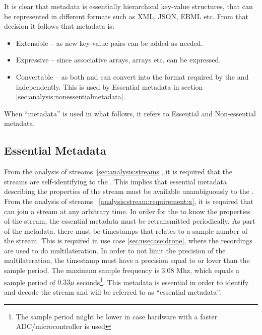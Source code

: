 It is clear that metadata is essentially hierarchical key-value structures, that can be represented in different formats such as XML, JSON, EBML etc.  From that decision it follows that metadata is:
\begin{itemize}
	\item Extensible -- as new key-value pairs can be added as needed.
	\item Expressive -- since associative arrays, arrays etc. can be expressed.
	\item Convertable -- as both  and  can convert into the format required by the  and  independently. This is used by Essential metadata in section \ref{sec:analysis:nonessentialmetadata}.
\end{itemize}

When ``metadata'' is used in what follows, it refers to Essential and Non-essential metadata.

\subsection{Essential Metadata} \label{sec:analysis:essentialmetadata}
From the analysis of streams~\ref{sec:analysis:streams}, it is required that the streams are self-identifying to the . This implies that essential metadata describing the properties of the stream must be available unambiguously to the .
From the analysis of streams ~\ref{analysis:stream:requirement:x}, it is required that  can join a stream at any arbitrary time.  In order for the  to know the properties of the stream, the essential metadata must be retransmitted periodically. As part of the metadata, there must be timestamps that relates to a sample number of the stream. This is required in use case \ref{sec:usecase:drone}, where the recordings are used to do multilateration. In order to not limit the precision of the multilateration, the timestamp must have a precision equal to or lover than the sample period. The maximum sample frequency is 3.08 Mhz, which equals a sample period of $0.33\mu$ seconds\footnote{The sample period might be lower in case hardware with a faster ADC/microcontroller is used}. This metadata is essential in order to identify and decode the stream and will be referred to as ``essential metadata''.



